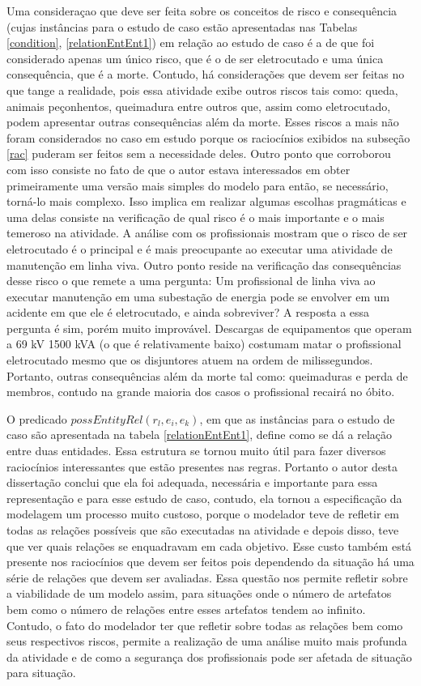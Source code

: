 Uma consideraçao que deve ser feita sobre os conceitos de risco e consequência (cujas instâncias para o estudo de caso estão apresentadas nas Tabelas \ref{condition}, \ref{relationEntEnt1}) em relação ao estudo de caso é a de que foi considerado apenas um único risco, que é o de ser eletrocutado e uma única consequência, que é a morte. Contudo, há considerações que devem ser feitas no que tange a realidade, pois essa atividade exibe outros riscos tais como: queda, animais peçonhentos, queimadura entre outros que, assim como eletrocutado, podem apresentar outras consequências além da morte. Esses riscos a mais não foram considerados no caso em estudo porque os raciocínios exibidos na subseção \ref{rac} puderam ser feitos sem a necessidade deles. Outro ponto que corroborou com isso consiste no fato de que o autor estava interessados em obter primeiramente uma versão mais simples do modelo para então, se necessário, torná-lo mais complexo. Isso implica em realizar algumas escolhas pragmáticas e uma delas consiste na verificação de qual risco é o mais importante e o mais temeroso na atividade. A análise com os profissionais mostram que o risco de ser eletrocutado é o principal e é mais preocupante ao executar uma atividade de manutenção em linha viva. Outro ponto reside na verificação das consequências desse risco o que remete a uma pergunta: Um profissional de linha viva ao executar manutenção em uma subestação de energia pode se envolver em um acidente em que ele é eletrocutado, e ainda sobreviver? A resposta a essa pergunta é sim, porém muito improvável. Descargas de equipamentos que operam a 69 kV 1500 kVA  (o que é relativamente baixo) costumam matar o profissional eletrocutado mesmo que os disjuntores atuem na ordem de milissegundos. Portanto, outras consequências além da morte tal como: queimaduras e perda de membros, contudo na grande maioria dos casos o profissional recairá no óbito. 

O predicado $possEntityRel(r_l,e_i,e_k)$, em que as instâncias para o estudo de caso são apresentada na tabela \ref{relationEntEnt1}, define como se dá a relação entre duas entidades. Essa estrutura se tornou muito útil para fazer diversos raciocínios interessantes que estão presentes nas regras. Portanto o autor desta dissertação conclui que ela foi adequada, necessária e importante para essa representação e para esse estudo de caso, contudo, ela tornou a especificação da modelagem um processo muito custoso, porque o modelador teve de refletir em todas as relações possíveis que são executadas na atividade e depois disso, teve que ver quais relações se enquadravam em cada objetivo. Esse custo também está presente nos raciocínios que devem ser feitos pois dependendo da situação há uma série de relações que devem ser avaliadas. Essa questão nos permite refletir sobre a viabilidade de um modelo assim, para situações onde o número de artefatos bem como o número de relações entre esses artefatos tendem ao infinito. Contudo, o fato do modelador ter que refletir sobre todas as relações bem como seus respectivos riscos, permite a realização de uma análise muito mais profunda da atividade e de como a segurança dos profissionais pode ser afetada de situação para situação. 

